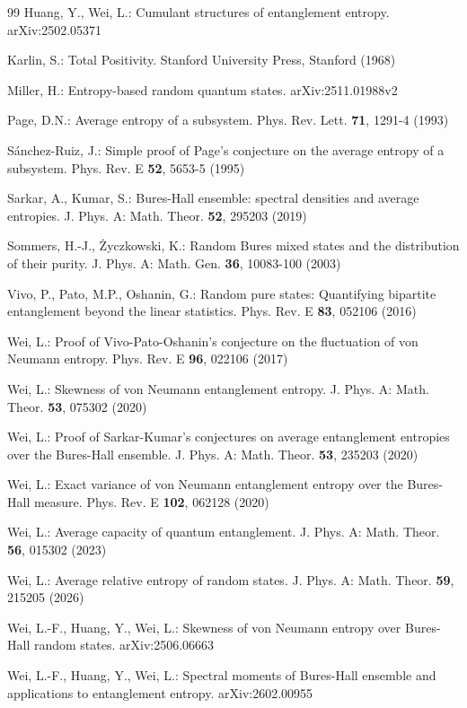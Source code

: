 \documentclass[pdflatex,sn-mathphys-num]{sn-jnl}%
\theoremstyle{thmstyleone}
\begin{document}
\begin{thebibliography}{99}
Huang, Y., Wei, L.: Cumulant structures of entanglement entropy. arXiv:2502.05371

Karlin, S.: Total Positivity. Stanford University Press, Stanford (1968)

Miller, H.: Entropy-based random quantum states. arXiv:2511.01988v2

Page, D.N.: Average entropy of a subsystem. Phys. Rev. Lett. {\bf 71}, 1291-4 (1993)

S\'{a}nchez-Ruiz, J.: Simple proof of Page's conjecture on the average entropy of a subsystem. Phys. Rev. E {\bf 52}, 5653-5 (1995)

Sarkar, A., Kumar, S.: Bures-Hall ensemble: spectral densities and average entropies. J. Phys. A: Math. Theor. {\bf 52}, 295203 (2019)

Sommers, H.-J., \.{Z}yczkowski, K.: Random Bures mixed states and the distribution of their purity. J. Phys. A: Math. Gen. {\bf 36}, 10083-100 (2003)

Vivo, P., Pato, M.P., Oshanin, G.: Random pure states: Quantifying bipartite entanglement beyond the linear statistics. Phys. Rev. E {\bf 83}, 052106 (2016)

Wei, L.: Proof of Vivo-Pato-Oshanin's conjecture on the fluctuation of von Neumann entropy. Phys. Rev. E {\bf 96}, 022106 (2017)

Wei, L.: Skewness of von Neumann entanglement entropy. J. Phys. A: Math. Theor. {\bf 53}, 075302 (2020)

Wei, L.: Proof of Sarkar-Kumar's conjectures on average entanglement entropies over the Bures-Hall ensemble. J. Phys. A: Math. Theor. {\bf 53}, 235203 (2020)

Wei, L.: Exact variance of von Neumann entanglement entropy over the Bures-Hall measure. Phys. Rev. E {\bf 102}, 062128 (2020)

Wei, L.: Average capacity of quantum entanglement. J. Phys. A: Math. Theor. {\bf 56}, 015302 (2023)

Wei, L.: Average relative entropy of random states. J. Phys. A: Math. Theor. {\bf 59}, 215205 (2026)

Wei, L.-F., Huang, Y., Wei, L.: Skewness of von Neumann entropy over Bures-Hall random states. arXiv:2506.06663

Wei, L.-F., Huang, Y., Wei, L.: Spectral moments of Bures-Hall ensemble and applications to entanglement entropy. arXiv:2602.00955

\end{thebibliography}
\end{document}
